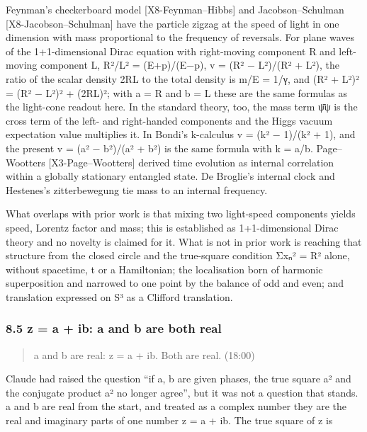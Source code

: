 \documentclass[
  a4paper,
]{article}
\begin{document}
Feynman's checkerboard model {[}X8-Feynman--Hibbs{]} and
Jacobson--Schulman {[}X8-Jacobson--Schulman{]} have the particle zigzag
at the speed of light in one dimension with mass proportional to the
frequency of reversals. For plane waves of the 1+1-dimensional Dirac
equation with right-moving component R and left-moving component L,
\textbar R\textbar²/\textbar L\textbar² = (E+p)/(E−p), v =
(\textbar R\textbar² − \textbar L\textbar²)/(\textbar R\textbar² +
\textbar L\textbar²), the ratio of the scalar density
2\textbar R\textbar\textbar L\textbar{} to the total density is m/E =
1/γ, and (\textbar R\textbar² + \textbar L\textbar²)² =
(\textbar R\textbar² − \textbar L\textbar²)² +
(2\textbar R\textbar\textbar L\textbar)²; with a = \textbar R\textbar{}
and b = \textbar L\textbar{} these are the same formulas as the
light-cone readout here. In the standard theory, too, the mass term ψ̄ψ
is the cross term of the left- and right-handed components and the Higgs
vacuum expectation value multiplies it. In Bondi's k-calculus v = (k² −
1)/(k² + 1), and the present v = (a² − b²)/(a² + b²) is the same formula
with k = a/b. Page--Wootters {[}X3-Page--Wootters{]} derived time
evolution as internal correlation within a globally stationary entangled
state. De Broglie's internal clock and Hestenes's zitterbewegung tie
mass to an internal frequency.

What overlaps with prior work is that mixing two light-speed components
yields speed, Lorentz factor and mass; this is established as
1+1-dimensional Dirac theory and no novelty is claimed for it. What is
not in prior work is reaching that structure from the closed circle and
the true-square condition Σxₙ² = R² alone, without spacetime, t or a
Hamiltonian; the localisation born of harmonic superposition and
narrowed to one point by the balance of odd and even; and translation
expressed on S³ as a Clifford translation.

\subsubsection{8.5 z = a + ib: a and b are both
real}\label{z-a-ib-a-and-b-are-both-real}

\begin{quote}
a and b are real: z = a + ib. Both are real. (18:00)
\end{quote}

Claude had raised the question ``if a, b are given phases, the true
square a² and the conjugate product \textbar a\textbar² no longer
agree'', but it was not a question that stands. a and b are real from
the start, and treated as a complex number they are the real and
imaginary parts of one number z = a + ib. The true square of z is
\end{document}
